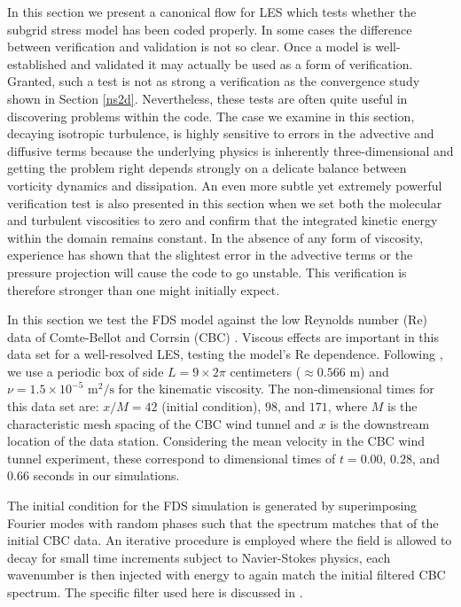 \documentclass[11pt]{book}
\begin{document}
In this section we present a canonical flow for LES which tests whether the subgrid stress model has been coded properly. In some cases the difference between verification and validation is not so clear.  Once a model is well-established and validated it may actually be used as a form of verification.  Granted, such a test is not as strong a verification as the convergence study shown in Section \ref{ns2d}.  Nevertheless, these tests are often quite useful in discovering problems within the code.  The case we examine in this section, decaying isotropic turbulence, is highly sensitive to errors in the advective and diffusive terms because the underlying physics is inherently three-dimensional and getting the problem right depends strongly on a delicate balance between vorticity dynamics and dissipation.  An even more subtle yet extremely powerful verification test is also presented in this section when we set both the molecular and turbulent viscosities to zero and confirm that the integrated kinetic energy within the domain remains constant.   In the absence of any form of viscosity, experience has shown that the slightest error in the advective terms or the pressure projection will cause the code to go unstable.  This verification is therefore stronger than one might initially expect.

In this section we test the FDS model against the low Reynolds number (Re) data of Comte-Bellot and Corrsin (CBC) \cite{CBC}. Viscous effects are important in this data set for a well-resolved LES, testing the model's Re dependence.  Following \cite{SdBK}, we use a periodic box of side $L = 9 \times 2\pi$ centimeters ($\approx 0.566$ m) and $\nu = 1.5 \times 10^{-5}$ $\mbox{m}^2/\mbox{s}$ for the kinematic viscosity. The non-dimensional times for this data set are: $x/M = 42$ (initial condition), $98$, and $171$, where $M$ is the characteristic mesh spacing of the CBC wind tunnel and $x$ is the downstream location of the data station. Considering the mean velocity in the CBC wind tunnel experiment, these correspond to dimensional times of $t = 0.00$, $0.28$, and $0.66$ seconds in our simulations.

The initial condition for the FDS simulation is generated by superimposing Fourier modes with random phases such that the spectrum matches that of the initial CBC data.  An iterative procedure is employed where the field is allowed to decay for small time increments subject to Navier-Stokes physics, each wavenumber is then injected with energy to again match the initial filtered CBC spectrum.  The specific filter used here is discussed in \cite{McDermott:2005b}.
\end{document}
